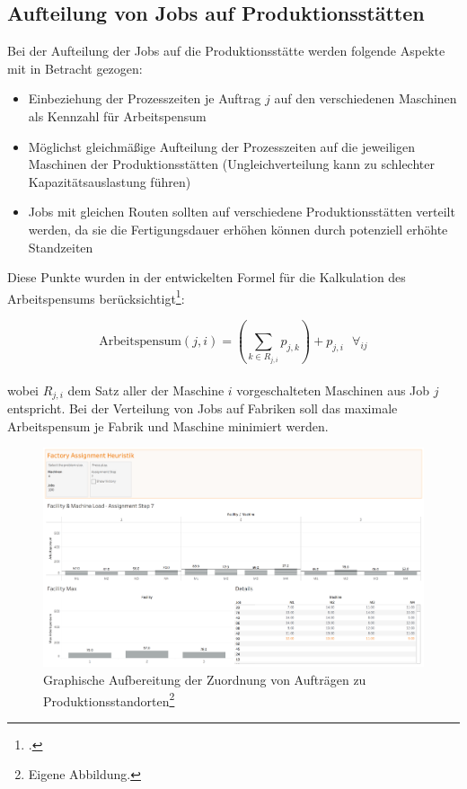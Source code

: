 \documentclass[final, english, ngerman, a4paper, 12pt, %
numbers=noenddot,
cd=true,
cdfont=false,cdfont=nohead,cdfont=nodin,
cdmath=false,
cdhead=false,
cdfoot=true,
cdcover=monochrome,
cdgeometry=symmetric,
declaration=heading,
declaration=notoc,
abstract=heading,
]{tudscrreprt}
\begin{document}
\subsection{Aufteilung von Jobs auf Produktionsstätten}
Bei der Aufteilung der Jobs auf die Produktionsstätte werden folgende Aspekte mit in Betracht gezogen:

\begin{itemize}
	\item Einbeziehung der Prozesszeiten je Auftrag $j$ auf den verschiedenen Maschinen als Kennzahl für Arbeitspensum
	\item Möglichst gleichmäßige Aufteilung der Prozesszeiten auf die jeweiligen Maschinen der Produktionsstätten (Ungleichverteilung kann zu schlechter Kapazitätsauslastung führen)
	\item Jobs mit gleichen Routen sollten auf verschiedene Produktionsstätten verteilt werden, da sie die Fertigungsdauer erhöhen können durch potenziell erhöhte Standzeiten
\end{itemize}

Diese Punkte wurden in der entwickelten Formel für die Kalkulation des Arbeitspensums berücksichtigt\footcite[S. 7756]{djs-modeling}:

\begin{equation}
\text{Arbeitspensum}(j,i)=\left(\sum_{k \in R_{j,i}} p_{j,k} \right) + p_{j,i} \text{  } \forall_{i j}
\end{equation}\\
wobei $R_{j,i}$ dem Satz aller der Maschine $i$ vorgeschalteten Maschinen aus Job $j$ entspricht. Bei der Verteilung von Jobs auf Fabriken soll das maximale Arbeitspensum je Fabrik und Maschine minimiert werden.

\begin{figure}[h]
	\centering
	\includegraphics[width=\textwidth]{./settings/assignment}
	\caption[Zuordnung von Aufträgen zu Produktionsstandorten]{Graphische Aufbereitung der Zuordnung von Aufträgen zu Produktionsstandorten\footnote{Eigene Abbildung.}}\label{fig:assignment}
\end{figure}
\end{document}
